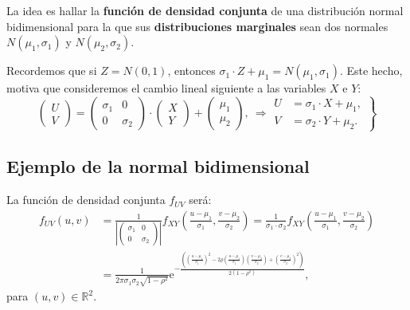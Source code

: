 \documentclass[]{book}
\begin{document}
La idea es hallar la \textbf{función de densidad conjunta} de una distribución normal bidimensional para la que sus \textbf{distribuciones marginales} sean dos normales \(N(\mu_1,\sigma_1)\) y \(N(\mu_2,\sigma_2)\).

Recordemos que si \(Z=N(0,1)\), entonces \(\sigma_1\cdot Z+\mu_1 =N(\mu_1,\sigma_1)\). Este hecho, motiva que consideremos el cambio lineal siguiente a las variables \(X\) e \(Y\):
\[
\begin{pmatrix}U\\ V\end{pmatrix}=\begin{pmatrix}\sigma_1 & 0\\ 0& \sigma_2\end{pmatrix}\cdot\begin{pmatrix}X\\ Y\end{pmatrix}+\begin{pmatrix}\mu_1\\\mu_2\end{pmatrix},\ \Rightarrow \left.\begin{array}{rl}U & = \sigma_1\cdot X+\mu_1,\\ V & =\sigma_2\cdot Y+\mu_2.\end{array}\right\}
\]

\hypertarget{ejemplo-de-la-normal-bidimensional-1}{%
\subsection{Ejemplo de la normal bidimensional}\label{ejemplo-de-la-normal-bidimensional-1}}

La función de densidad conjunta \(f_{UV}\) será:
\[
\begin{array}{rl}
f_{UV}(u,v) & = \frac{1}{\left|\begin{pmatrix}\sigma_1 & 0\\ 0& \sigma_2\end{pmatrix}\right|} f_{XY}\left(\frac{u-\mu_1}{\sigma_1},\frac{v-\mu_2}{\sigma_2}\right)
=\frac{1}{\sigma_1\cdot \sigma_2}f_{XY}\left(\frac{u-\mu_1}{\sigma_1},\frac{v-\mu_2}{\sigma_2}\right)\\ & =
\frac{1}{2\pi\sigma_1\sigma_2\sqrt{1-\rho^2}}\mathrm{e}^{-\frac{\left(\left(\frac{u-\mu_1}{\sigma_1}\right)^2-2\rho \left(\frac{u-\mu_1}{\sigma_1}\right)\left(\frac{v-\mu_2}{\sigma_2}\right)+\left(\frac{v-\mu_2}{\sigma_2}\right)^2\right)}{2(1-\rho^2)}},
\end{array}
\]
para \((u,v)\in\mathbb{R}^2\).
\end{document}
